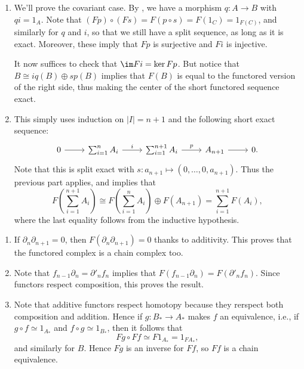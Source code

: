 \documentclass[../../solutions.tex]{subfiles}
\begin{document}
\begin{exercise} \leavevmode
\begin{enumerate}
\item
We'll prove the covariant case.
By , we have a morphism $q:A\to B$ with $qi=1_A$.
Note that $(Fp)\circ(Fs)=F(p\circ s)=F(1_C)=1_{F(C)}$, and similarly for $q$ and $i$, so that we still have a split sequence, as long as it is exact.
Moreover, these imply that $Fp$ is surjective and $Fi$ is injective.

It now suffices to check that $\im Fi=\ker Fp$.
But notice that $B\cong iq(B)\oplus sp(B)$ implies that $F(B)$ is equal to the functored version of the right side, thus making the center of the short functored sequence exact.

\item
This simply uses induction on $|I|=n+1$ and the following short exact sequence:
\[
\begin{tikzcd}
0\ar[r] & \sum_{i=1}^nA_i\ar[r,"i"] & \sum_{i=1}^{n+1}A_i\ar[r,"p"] & A_{n+1}\ar[r] & 0.
\end{tikzcd}
\]
Note that this is split exact with $s:a_{n+1}\mapsto(0,\dots,0,a_{n+1})$.
Thus the previous part applies, and  implies that
\[F\left(\sum_{i=1}^{n+1}A_i\right)\cong F\left(\sum_{i=1}^nA_i\right)\oplus F(A_{n+1})=\sum_{i=1}^{n+1}F(A_i),\]
where the last equality follows from the inductive hypothesis.
\end{enumerate}
\end{exercise}

\begin{exercise} \leavevmode
\begin{enumerate}
\item
If $\partial_n\partial_{n+1}=0$, then $F(\partial_n\partial_{n+1})=0$ thanks to additivity.
This proves that the functored complex is a chain complex too.

\item
Note that $f_{n-1}\partial_n=\partial'_nf_n$ implies that $F(f_{n-1}\partial_n)=F(\partial'_nf_n)$.
Since functors respect composition, this proves the result.

\item
Note that additive functors respect homotopy because they rerspect both composition and addition.
Hence if $g:B_*\to A_*$ makes $f$ an equivalence, i.e., if $g\circ f\simeq 1_{A_*}$ and $f\circ g\simeq 1_{B_*}$, then it follows that
\[Fg\circ Ff\simeq F1_{A_*}=1_{FA_*},\]
and similarly for $B$.
Hence $Fg$ is an inverse for $Ff$, so $Ff$ is a chain equivalence.
\end{enumerate}
\end{exercise}
\end{document}

